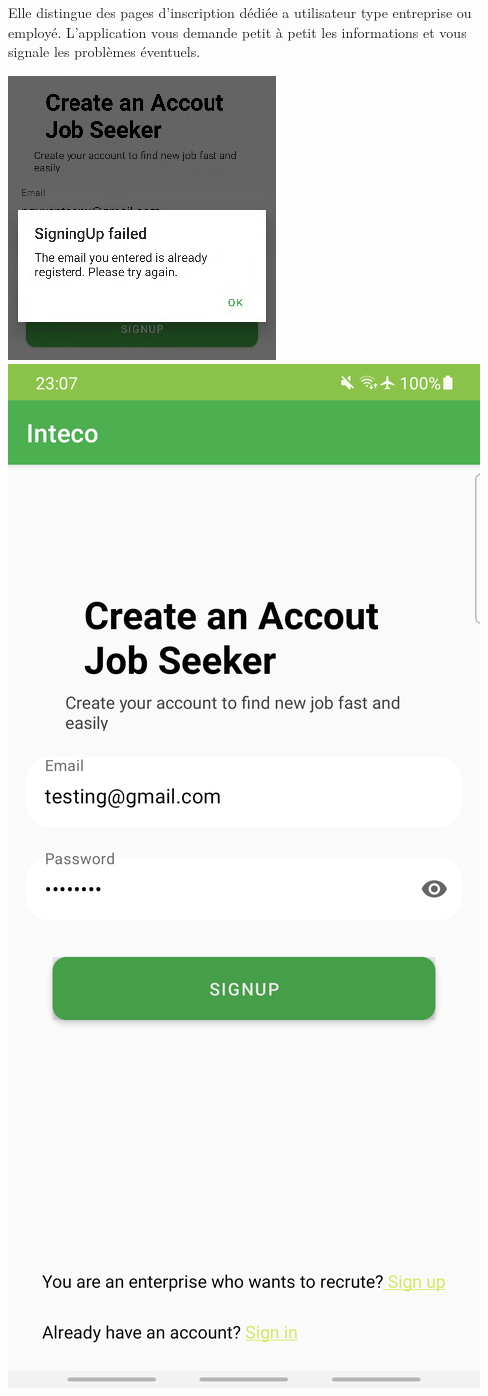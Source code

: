 \documentclass[a4paper]{article}
\begin{document}
\begin{multicols}{2}
        Elle distingue des pages d'inscription dédiée a utilisateur type entreprise ou employé. L'application vous demande petit à petit les informations et vous signale les problèmes éventuels.

        \noindent\includegraphics[width=.47\textwidth]{signin/fail}
        \noindent\includegraphics[width=.47\textwidth]{signin/page1}

\end{multicols}
\end{document}
